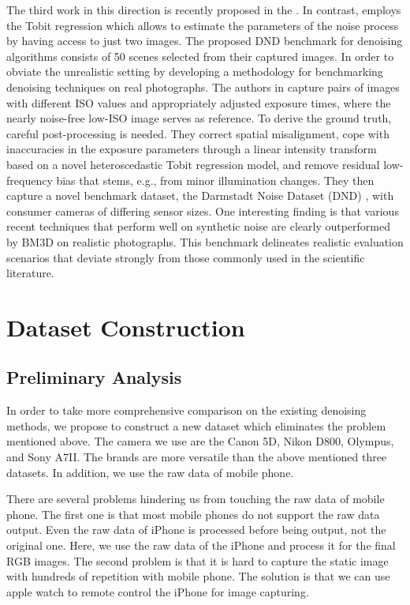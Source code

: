 The third work in this direction is recently proposed in the \cite{dnd2017}. In contrast, \cite{dnd2017} employs the Tobit regression which allows to estimate the parameters of the noise process by having access to just two images. The proposed DND benchmark for denoising algorithms consists of 50 scenes selected from their captured images. In order to obviate the unrealistic setting by developing a methodology for benchmarking denoising techniques on real photographs. The authors in \cite{dnd2017} capture pairs of images with different ISO values and appropriately adjusted exposure times, where the nearly noise-free low-ISO image serves as reference. To derive the ground truth, careful post-processing is needed. They correct spatial misalignment, cope with inaccuracies in the exposure parameters through a linear intensity transform based on a novel heteroscedastic Tobit regression model, and remove residual low-frequency bias that stems, e.g., from minor illumination changes. They then capture a novel benchmark dataset, the Darmstadt Noise Dataset (DND) \cite{dnd2017}, with consumer cameras of differing sensor sizes. One interesting finding is that various recent techniques that perform well on synthetic noise are clearly outperformed by BM3D \cite{bm3d} on realistic photographs. This benchmark delineates realistic evaluation scenarios that deviate strongly from those commonly used in the scientific literature.


\section{Dataset Construction}

\subsection{Preliminary Analysis}

In order to take more comprehensive comparison on the existing denoising methods, we propose to construct a new dataset which eliminates the problem mentioned above. The camera we use are the Canon 5D, Nikon D800, Olympus, and Sony A7II. The brands are more versatile than the above mentioned three datasets. In addition, we use the raw data of mobile phone. 

There are several problems hindering us from touching the raw data of mobile phone. The first one is that most mobile phones do not support the raw data output. Even the raw data of  iPhone is processed before being output, not the original one. Here, we use the raw data of the iPhone and process it for the final RGB images. The second problem is that it is hard to capture the static image with hundreds of repetition with mobile phone. The solution is that we can use apple watch to remote control the iPhone for image capturing. 

